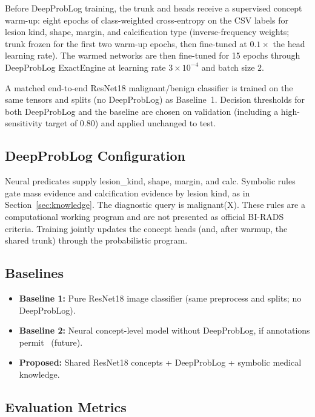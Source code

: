 Before DeepProbLog training, the trunk and heads receive a supervised concept warm-up: eight epochs of class-weighted cross-entropy on the CSV labels for lesion kind, shape, margin, and calcification type (inverse-frequency weights; trunk frozen for the first two warm-up epochs, then fine-tuned at $0.1\times$ the head learning rate). The warmed networks are then fine-tuned for 15 epochs through DeepProbLog ExactEngine at learning rate $3\times 10^{-4}$ and batch size $2$.

A matched end-to-end ResNet18 malignant/benign classifier is trained on the same tensors and splits (no DeepProbLog) as Baseline~1. Decision thresholds for both DeepProbLog and the baseline are chosen on validation (including a high-sensitivity target of $0.80$) and applied unchanged to test.

\subsection{DeepProbLog Configuration}
\label{sec:dplconfig}

Neural predicates supply lesion\_kind, shape, margin, and calc. Symbolic rules gate mass evidence and calcification evidence by lesion kind, as in Section~\ref{sec:knowledge}. The diagnostic query is malignant(X). These rules are a computational working program and are not presented as official BI-RADS criteria. Training jointly updates the concept heads (and, after warmup, the shared trunk) through the probabilistic program.

\subsection{Baselines}
\label{sec:baselines}

\begin{itemize}
\item \textbf{Baseline 1:} Pure ResNet18 image classifier (same preprocess and splits; no DeepProbLog).
\item \textbf{Baseline 2:} Neural concept-level model without DeepProbLog, if annotations permit~\cite{koh2020concept} (future).
\item \textbf{Proposed:} Shared ResNet18 concepts + DeepProbLog + symbolic medical knowledge.
\end{itemize}

\subsection{Evaluation Metrics}
\label{sec:metrics}

